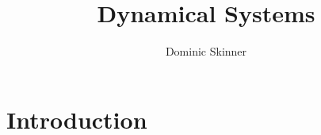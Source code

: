 \documentclass{article}
\begin{document}
\title{Dynamical Systems}
\author{Dominic Skinner}
\maketitle
\section*{Introduction}
\end{document}
